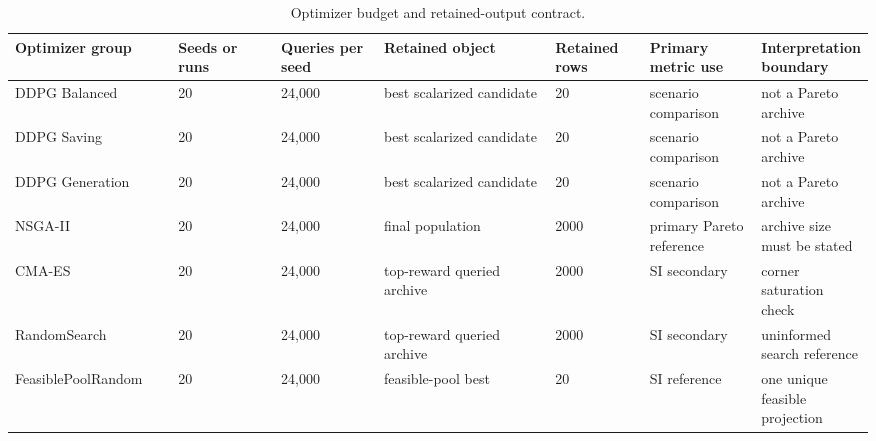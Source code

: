 \begin{table}[H]
\begin{revblock}
\caption{Optimizer budget and retained-output contract.}
\label{tab:optimizer-contract}
\centering
\scriptsize
\begin{threeparttable}
\begin{tabularx}{\linewidth}{@{}p{0.19\linewidth}p{0.12\linewidth}p{0.12\linewidth}p{0.20\linewidth}p{0.11\linewidth}p{0.13\linewidth}p{0.13\linewidth}@{}}
\toprule
Optimizer group & Seeds or runs & Queries per seed & Retained object & Retained rows & Primary metric use & Interpretation boundary \\
\midrule
DDPG Balanced & 20 & 24,000 & best scalarized candidate & 20 & scenario comparison & not a Pareto archive \\
DDPG Saving & 20 & 24,000 & best scalarized candidate & 20 & scenario comparison & not a Pareto archive \\
DDPG Generation & 20 & 24,000 & best scalarized candidate & 20 & scenario comparison & not a Pareto archive \\
NSGA-II & 20 & 24,000 & final population & 2000 & primary Pareto reference & archive size must be stated \\
CMA-ES & 20 & 24,000 & top-reward queried archive & 2000 & SI secondary & corner saturation check \\
RandomSearch & 20 & 24,000 & top-reward queried archive & 2000 & SI secondary & uninformed search reference \\
FeasiblePoolRandom & 20 & 24,000 & feasible-pool best & 20 & SI reference & one unique feasible projection \\
\bottomrule
\end{tabularx}
\end{threeparttable}
\end{revblock}
\end{table}

\subsection{}


